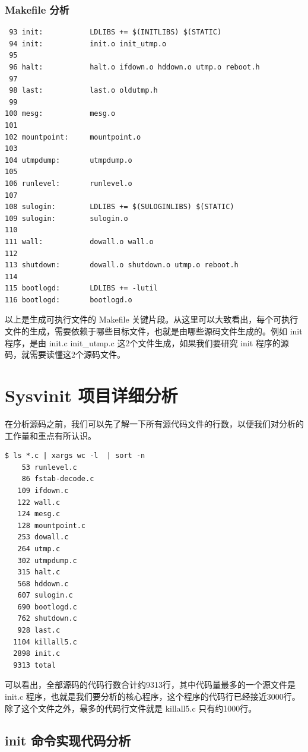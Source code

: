 \subsection{Makefile 分析}

{\begin{shaded}\begin{verbatim}
 93 init:           LDLIBS += $(INITLIBS) $(STATIC)
 94 init:           init.o init_utmp.o
 95 
 96 halt:           halt.o ifdown.o hddown.o utmp.o reboot.h
 97 
 98 last:           last.o oldutmp.h
 99 
100 mesg:           mesg.o
101 
102 mountpoint:     mountpoint.o
103 
104 utmpdump:       utmpdump.o
105 
106 runlevel:       runlevel.o
107 
108 sulogin:        LDLIBS += $(SULOGINLIBS) $(STATIC)
109 sulogin:        sulogin.o
110 
111 wall:           dowall.o wall.o
112 
113 shutdown:       dowall.o shutdown.o utmp.o reboot.h
114 
115 bootlogd:       LDLIBS += -lutil
116 bootlogd:       bootlogd.o
\end{verbatim}\end{shaded}}
以上是生成可执行文件的 Makefile
关键片段。从这里可以大致看出，每个可执行文件的生成，需要依赖于哪些目标文件，也就是由哪些源码文件生成的。例如
init 程序，是由 init.c init\_utmp.c 这2个文件生成，如果我们要研究 init
程序的源码，就需要读懂这2个源码文件。

\chapter{Sysvinit 项目详细分析}

在分析源码之前，我们可以先了解一下所有源代码文件的行数，以便我们对分析的工作量和重点有所认识。

{\begin{shaded}\begin{verbatim}
$ ls *.c | xargs wc -l  | sort -n
    53 runlevel.c
    86 fstab-decode.c
   109 ifdown.c
   122 wall.c
   124 mesg.c
   128 mountpoint.c
   253 dowall.c
   264 utmp.c
   302 utmpdump.c
   315 halt.c
   568 hddown.c
   607 sulogin.c
   690 bootlogd.c
   762 shutdown.c
   928 last.c
  1104 killall5.c
  2898 init.c
  9313 total
\end{verbatim}\end{shaded}}
可以看出，全部源码的代码行数合计约9313行，其中代码量最多的一个源文件是
init.c
程序，也就是我们要分析的核心程序，这个程序的代码行已经接近3000行。除了这个文件之外，最多的代码行文件就是
killall5.c 只有约1000行。

\section{init 命令实现代码分析}

